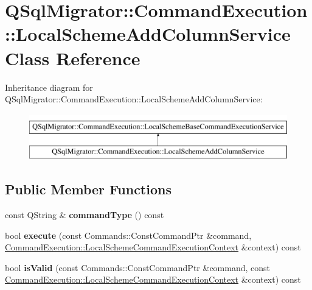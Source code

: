 \hypertarget{class_q_sql_migrator_1_1_command_execution_1_1_local_scheme_add_column_service}{}\section{Q\+Sql\+Migrator\+:\+:Command\+Execution\+:\+:Local\+Scheme\+Add\+Column\+Service Class Reference}
\label{class_q_sql_migrator_1_1_command_execution_1_1_local_scheme_add_column_service}
Inheritance diagram for Q\+Sql\+Migrator\+:\+:Command\+Execution\+:\+:Local\+Scheme\+Add\+Column\+Service\+:\begin{figure}[H]
\begin{center}
\leavevmode
\includegraphics[height=2.000000cm]{class_q_sql_migrator_1_1_command_execution_1_1_local_scheme_add_column_service}
\end{center}
\end{figure}
\subsection*{Public Member Functions}
\begin{DoxyCompactItemize}
\item 
\mbox{\label{class_q_sql_migrator_1_1_command_execution_1_1_local_scheme_add_column_service_a0d99afce23e4f50d7f5f7dfe355c4f84}} 
const Q\+String \& {\bfseries command\+Type} () const
\item 
\mbox{\label{class_q_sql_migrator_1_1_command_execution_1_1_local_scheme_add_column_service_aaeffa9ee648ea0c73f9febc069f0816a}} 
bool {\bfseries execute} (const Commands\+::\+Const\+Command\+Ptr \&command, \hyperlink{class_q_sql_migrator_1_1_command_execution_1_1_local_scheme_command_execution_context}{Command\+Execution\+::\+Local\+Scheme\+Command\+Execution\+Context} \&context) const
\item 
\mbox{\label{class_q_sql_migrator_1_1_command_execution_1_1_local_scheme_add_column_service_a2b7965fcfc991d4398e3cbed03b31efe}} 
bool {\bfseries is\+Valid} (const Commands\+::\+Const\+Command\+Ptr \&command, const \hyperlink{class_q_sql_migrator_1_1_command_execution_1_1_local_scheme_command_execution_context}{Command\+Execution\+::\+Local\+Scheme\+Command\+Execution\+Context} \&context) const
\end{DoxyCompactItemize}


